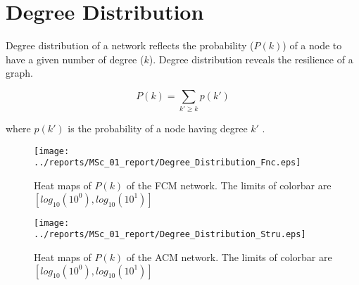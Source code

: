\section{Degree Distribution}
Degree distribution of a network reflects the probability ($P(k)$) of a node to have a given number of degree ($k$). Degree distribution reveals the resilience of a graph. 

\begin{equation}
 P(k) = \sum\limits_{k' \geq k} p(k')
\end{equation}

where $p(k')$ is the probability of a node having degree $k'$ \citep{BAR99a}. 


\begin{figure}[htbp]
 
  \centering
	 \texttt{[image: ../reports/MSc\_01\_report/Degree\_Distribution\_Fnc.eps]}
  \caption[Degree Distribution, FCM]{Heat maps of $P(k)$ of the FCM network. The limits of colorbar are $[log_{10}(10^0), log_{10}(10^1)]$} 
    \label{fig:Degree Distribution, FCM}
 	
\end{figure}



\begin{figure}[htbp]
 
  \centering
	 \texttt{[image: ../reports/MSc\_01\_report/Degree\_Distribution\_Stru.eps]}
  \caption[Degree Distribution, ACM]{Heat maps of $P(k)$ of the ACM network. The limits of colorbar are $[log_{10}(10^0), log_{10}(10^1)]$} 
    \label{fig:Degree Distribution, ACM}
 	
\end{figure}



